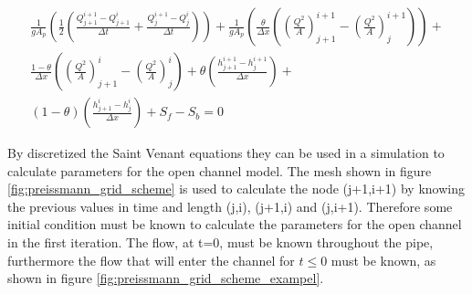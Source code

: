 \begin{multline}
	\frac{1}{gA_p}\left(\frac{1}{2} \left(\frac{Q_{j+1}^{i+1}-Q_{j+1}^i}{\Delta t}+\frac{Q_{j}^{i+1} - Q_j^i}{\Delta t}\right)\right) + \frac{1}{gA_p}\left(\frac{\theta}{\Delta x} \left(\left(\frac{Q^2}{A}\right)_{j+1}^{i+1}-\left(\frac{Q^2}{A}\right)_{j}^{i+1}\right)\right) + \\ \frac{1-\theta}{\Delta x}\left(\left(\frac{Q^2}{A}\right)_{j+1}^{i}-\left(\frac{Q^2}{A}\right)_{j}^{i}\right)+\theta \left(\frac{h_{j+1}^{i+1}-h_j^{i+1}}{\Delta x}\right)+ \\ (1-\theta)\left(\frac{h_{j+1}^{i} - h_j^i}{\Delta x}\right)+S_f-S_b= 0 
\end{multline}

By discretized the Saint Venant equations they can be used in a simulation to calculate parameters for the open channel model. The mesh shown in figure \ref{fig:preissmann_grid_scheme} is used to calculate the node (j+1,i+1) by knowing the previous values in time and length (j,i), (j+1,i) and (j,i+1). Therefore some initial condition must be known to calculate the parameters for the open channel in the first iteration. The flow, at t=0, must be known throughout the pipe, furthermore the flow that will enter the channel for $t\leq 0$ must be known, as shown in figure \ref{fig:preissmann_grid_scheme_exampel}.   


